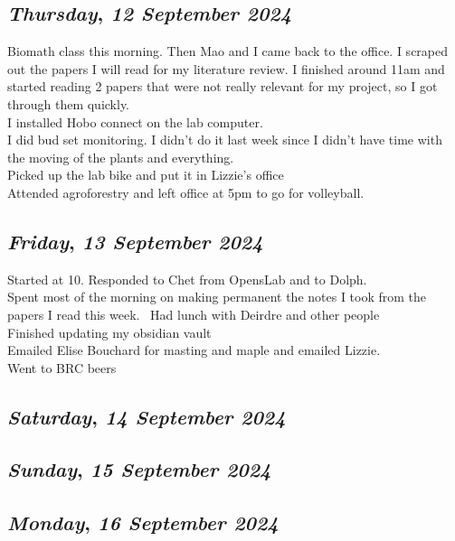 \def\day{\textit{12 September 2024}}
\def\weekday{\textit{Thursday}}
\subsection*{\weekday, \day}
Biomath class this morning. Then Mao and I came back to the office. I scraped out the papers I will  read for my literature review. I finished around 11am and started reading 2 papers that were not really relevant for my project, so I got through them quickly. \\
I installed Hobo connect on the lab computer. \\
I did bud set monitoring. I didn't do it last week since I didn't have time with the moving of the plants and everything.\\
Picked up the lab bike and put it in Lizzie's office\\
Attended agroforestry and left office at 5pm to go for volleyball. 
 
\def\day{\textit{13 September 2024}}
\def\weekday{\textit{Friday}}
\subsection*{\weekday, \day}
Started at 10. Responded to Chet from OpensLab and to Dolph. \\
Spent most of the morning on making permanent the notes I took from the papers I read this week. \
Had lunch with Deirdre and other people\\
Finished updating my obsidian vault\\
Emailed Elise Bouchard for masting and maple and emailed Lizzie.\\
Went to BRC beers

\def\day{\textit{14 September 2024}}
\def\weekday{\textit{Saturday}}
\subsection*{\weekday, \day}

\def\day{\textit{15 September 2024}}
\def\weekday{\textit{Sunday}}
\subsection*{\weekday, \day}

\def\day{\textit{16 September 2024}}
\def\weekday{\textit{Monday}}
\subsection*{\weekday, \day}

